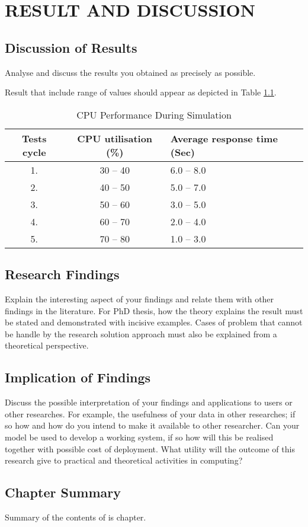 \chapter{\large RESULT AND DISCUSSION}
\thispagestyle{empty}
\section{Discussion of Results}
Analyse and discuss the results you obtained as precisely as possible. 


Result that include range of values should appear as depicted in 
Table \ref{tab-rang}.

\begin{table}[!h]
	\caption{CPU Performance During Simulation}
	\label{tab-rang}
	\centering
	\begin{tabular}{ccl}
		\hline \hline
		Tests cycle & CPU utilisation (\%) & Average response time (Sec)\\
		\hline
		1. & 30 -- 40 & 6.0 -- 8.0\\
		2. & 40 -- 50 & 5.0 -- 7.0\\
		3. & 50 -- 60 & 3.0 -- 5.0\\
		4. & 60 -- 70 & 2.0 -- 4.0\\
		5. & 70 -- 80 & 1.0 -- 3.0\\
		\hline\hline 
	\end{tabular}
\end{table}



\section{Research Findings}
Explain the interesting aspect of your findings and relate them with other findings in the literature. For PhD thesis, how the theory explains the result must be stated and demonstrated with incisive examples. Cases of problem that cannot be handle by the research solution approach must also be explained from a theoretical perspective. 

 
\section{Implication of Findings}
Discuss the possible interpretation of your findings and applications to users or other researches. For example, the usefulness of your data in other researches; if so how and how do you intend to make it available to other researcher.
Can your model be used to develop a working system, if so how will this be realised together with possible cost of deployment. What utility will the outcome of this research give to practical and theoretical activities in computing?

\section{Chapter Summary}

Summary of the contents of is chapter.
